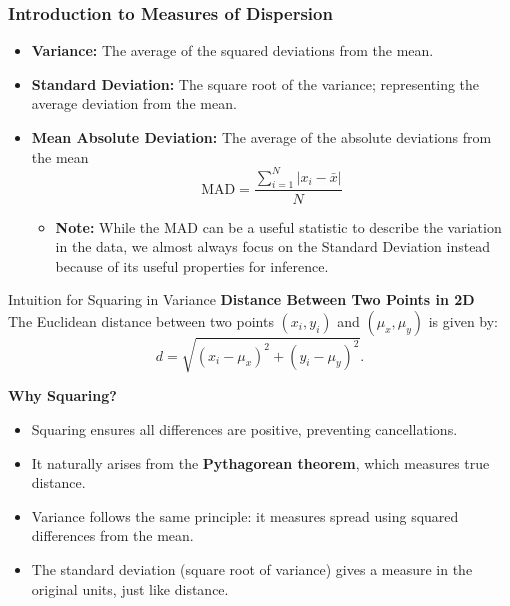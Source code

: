 \documentclass[handout]{beamer} %
\begin{document}
\begin{frame}
\frametitle{Introduction to Measures of Dispersion}
\begin{itemize}
    \item \textbf{Variance:} The average of the squared deviations from the mean.
    \item \textbf{Standard Deviation:} The square root of the variance; representing the average deviation from the mean.
    \item \textbf{Mean Absolute Deviation:} The average of the absolute deviations from the mean
        \begin{equation*}
        \text{MAD} = \frac{\sum_{i=1}^N |x_i - \bar{x}|}{N}
    \end{equation*}
    \begin{itemize}
        \item \textbf{Note:} While the MAD can be a useful statistic to describe the variation in the data, we almost always focus on the Standard Deviation instead because of its useful properties for inference.
    \end{itemize}
\end{itemize}
\end{frame}


\begin{frame}{Intuition for Squaring in Variance}
    \textbf{Distance Between Two Points in 2D}\\[6pt]
    The Euclidean distance between two points \( (x_i, y_i) \) and \( (\mu_x, \mu_y) \) is given by:
    \[
        d = \sqrt{(x_i - \mu_x)^2 + (y_i - \mu_y)^2}.
    \]

    \textbf{Why Squaring?}
    \begin{itemize}
        \item Squaring ensures all differences are positive, preventing cancellations.
        \item It naturally arises from the \textbf{Pythagorean theorem}, which measures true distance.
        \item Variance follows the same principle: it measures spread using squared differences from the mean.
        \item The standard deviation (square root of variance) gives a measure in the original units, just like distance.
    \end{itemize}

\end{frame}
\end{document}
